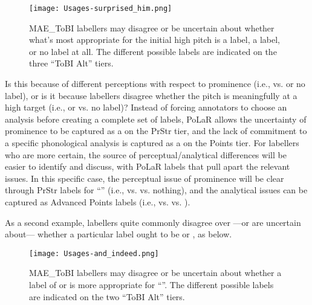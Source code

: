 \begin{figure}[H]
\centering
%
\texttt{[image: Usages-surprised\_him.png]}
%
\caption{MAE\_ToBI labellers may disagree or be uncertain about whether what’s most appropriate for the initial high pitch is a  label, a  label, or no label at all. The different possible labels are indicated on the three “ToBI Alt” tiers.%
\label{fig:Usages surprised him}%
}
\end{figure}

Is this because of different perceptions with respect to prominence (i.e.,  vs.  or no label), or is it because labellers disagree whether the pitch is meaningfully at a high target (i.e.,  or  vs. no label)? Instead of forcing annotators to choose an analysis before creating a complete set of labels, PoLaR allows the uncertainty of prominence to be captured as a  on the PrStr tier, and the lack of commitment to a specific phonological analysis is captured as a  on the Points tier. For labellers who are more certain, the source of perceptual\slash analytical differences will be easier to identify and discuss, with PoLaR labels that pull apart the relevant issues. In this specific case, the perceptual issue of prominence will be clear through PrStr labels for “” (i.e., \textlabel{*} vs.  vs. nothing), and the analytical issues can be captured as Advanced Points labels (i.e., \textlabel{<[} vs. \textlabel{<*} vs. ).

As a second example, labellers quite commonly disagree over —or are uncertain about— whether a particular label ought to be  or , as below.

\begin{figure}[H]
\centering
%
\texttt{[image: Usages-and\_indeed.png]}
%
\caption{MAE\_ToBI labellers may disagree or be uncertain about whether a label of  or  is more appropriate for “”. The different possible labels are indicated on the two “ToBI Alt” tiers.%
\label{fig:Usages and indeed}%
}
\end{figure}

